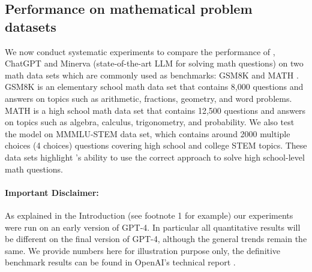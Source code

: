 \subsection{Performance on mathematical problem datasets} 
\label{subsection:pm}

We now conduct systematic experiments to compare the performance of {\DV}, ChatGPT and Minerva (state-of-the-art LLM for solving math questions) on two math data sets which are commonly used as benchmarks: GSM8K \cite{cobbe2021training} and MATH \cite{hendrycksmath2021}. GSM8K is an elementary school math data set that contains 8,000 questions and answers on topics such as arithmetic, fractions, geometry, and word problems. MATH is a high school math data set that contains 12,500 questions and answers on topics such as algebra, calculus, trigonometry, and probability. We also test the model on MMMLU-STEM data set, which contains around 2000 multiple choices (4 choices) questions covering high school and college STEM topics. These data sets highlight {\DV}'s ability to use the correct approach to solve high school-level math questions.


\paragraph{Important Disclaimer:} As explained in the Introduction (see footnote 1 for example) our experiments were run on an early version of GPT-4. In particular all quantitative results will be different on the final version of GPT-4, although the general trends remain the same. We provide numbers here for illustration purpose only, the definitive benchmark results can be found in OpenAI's technical report \cite{gpt4}.

